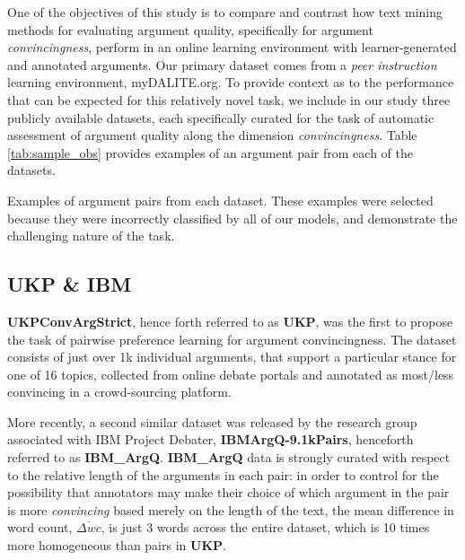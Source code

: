 \documentclass[runningheads]{llncs}
\begin{document}
One of the objectives of this study is to compare and contrast how text 
mining methods for evaluating argument quality, specifically for argument 
\textit{convincingness}, perform in an online learning environment with 
learner-generated and annotated arguments. 
Our primary dataset comes from a \textit{peer instruction} learning 
environment, myDALITE.org. 
To provide context as to the performance that can be expected for this 
relatively novel task, we include in our study three publicly available 
datasets, each specifically curated for the task of automatic assessment of 
argument quality along the dimension \textit{convincingness}. 
Table \ref{tab:sample_obs} provides examples of an argument pair 
from each of the datasets.


\begin{table}
	\caption{Examples of argument pairs from each dataset. These examples were 
	selected because they were incorrectly classified by all of our models, and 
	demonstrate the challenging nature of the task.}
	\label{tab:sample_obs}
	\begin{subtable}[t]{\textwidth}
	
	\end{subtable}
	\begin{subtable}[t]{\textwidth}
	
	\end{subtable}
	\begin{subtable}[t]{\textwidth}
	
	\end{subtable}
\end{table}



\subsection{UKP \& IBM}
\textbf{UKPConvArgStrict}\cite{habernal_which_2016}, hence forth referred to as 
\textbf{UKP}, was the first to propose the task of pairwise preference learning 
for argument convincingness. 
The dataset consists of just over 1k individual arguments, that support a 
particular stance for one of 16 topics, collected from online debate portals 
and annotated as most/less convincing in a crowd-sourcing platform.  

More recently, a second similar dataset was released by the research group 
associated with IBM Project Debater, 
\textbf{IBMArgQ-9.1kPairs}\cite{toledo_automatic_2019}, henceforth 
referred to as \textbf{IBM\_ArgQ}.
\textbf{IBM\_ArgQ} data is strongly curated with respect to the relative length 
of the arguments in each pair: in order to control for the possibility that 
annotators may make their choice of which argument in the pair is more 
\textit{convincing} based merely on the length of the text, the mean difference 
in word count, $\overline{\Delta wc}$, is just 3 words across the entire 
dataset, which is 10 times more homogeneous than pairs in \textbf{UKP}.
\end{document}
